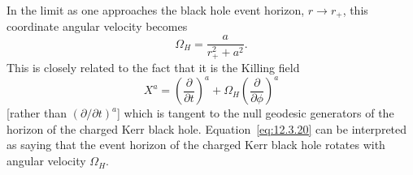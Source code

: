 

In the limit as one approaches the black hole event horizon, \(r\to r_+\), this
coordinate angular velocity becomes
\begin{equation}
 \Omega_H=\frac{a}{r_+^2+a^2}.
 \tag{12.3.19}\label{eq:12.3.19}
\end{equation}
This is closely related to the fact that it is the Killing field
\begin{equation}
 X^a=\left(\frac{\partial}{\partial t}\right)^a+
       \Omega_H\left(\frac{\partial}{\partial\phi}\right)^a
 \tag{12.3.20}\label{eq:12.3.20}
\end{equation}
[rather than \((\partial/\partial t)^a\)] which is tangent to the null geodesic
generators of the horizon of the charged Kerr black hole. Equation~\eqref{eq:12.3.20}
can be interpreted as saying that the event horizon of the charged Kerr black hole
rotates with angular velocity \(\Omega_H\).

